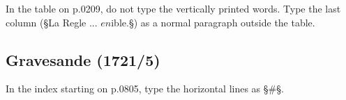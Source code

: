 \documentclass[fontsize=11pt, paper=a4, 
DIV15,
normalheadings,
parskip=half-, 
pointlessnumbers]{scrartcl}
\begin{document}
\begin{mainrule}
In the table on p.0209, do not type the vertically printed words. Type the last column (§La Regle ... $en$ible.§) as a normal paragraph outside the table.
\end{mainrule}


\subsection{Gravesande (1721/5)}

\begin{mainrule}
In the index starting on p.0805, type the horizontal lines as §#§.
\end{mainrule}





\end{document}
